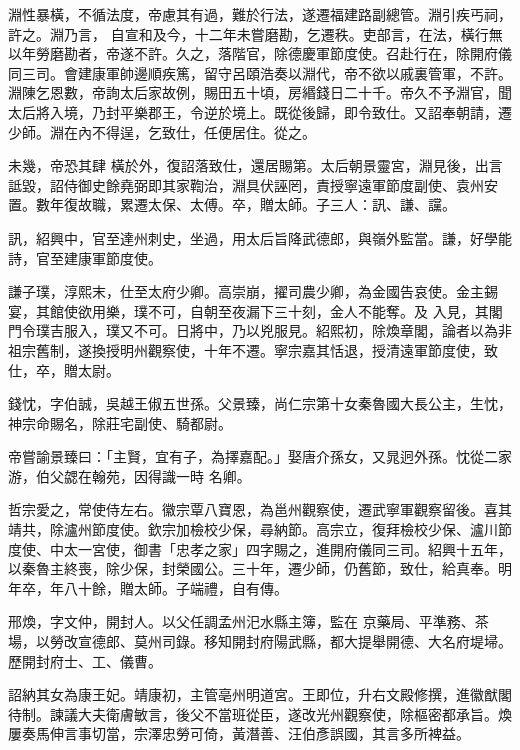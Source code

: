 \begin{pinyinscope}
 淵性暴橫，不循法度，帝慮其有過，難於行法，遂遷福建路副總管。淵引疾丐祠，許之。淵乃言，
 自宣和及今，十二年未嘗磨勘，乞遷秩。吏部言，在法，橫行無以年勞磨勘者，帝遂不許。久之，落階官，除德慶軍節度使。召赴行在，除開府儀同三司。會建康軍帥邊順疾篤，留守呂頤浩奏以淵代，帝不欲以戚裏管軍，不許。淵陳乞恩數，帝詢太后家故例，賜田五十頃，房緡錢日二十千。帝久不予淵官，聞太后將入境，乃封平樂郡王，令逆於境上。既從後歸，即令致仕。又詔奉朝請，遷少師。淵在內不得逞，乞致仕，任便居住。從之。



 未幾，帝恐其肆
 橫於外，復詔落致仕，還居賜第。太后朝景靈宮，淵見後，出言詆毀，詔侍御史餘堯弼即其家鞫治，淵具伏誣罔，責授寧遠軍節度副使、袁州安置。數年復故職，累遷太保、太傅。卒，贈太師。子三人：訊、謙、讜。



 訊，紹興中，官至達州刺史，坐過，用太后旨降武德郎，與嶺外監當。謙，好學能詩，官至建康軍節度使。



 謙子璞，淳熙末，仕至太府少卿。高崇崩，擢司農少卿，為金國告哀使。金主錫宴，其館使欲用樂，璞不可，自朝至夜漏下三十刻，金人不能奪。及
 入見，其閣門令璞吉服入，璞又不可。日將中，乃以兇服見。紹熙初，除煥章閣，論者以為非祖宗舊制，遂換授明州觀察使，十年不遷。寧宗嘉其恬退，授清遠軍節度使，致仕，卒，贈太尉。



 錢忱，字伯誠，吳越王俶五世孫。父景臻，尚仁宗第十女秦魯國大長公主，生忱，神宗命賜名，除莊宅副使、騎都尉。



 帝嘗諭景臻曰：「主賢，宜有子，為擇嘉配。」娶唐介孫女，又晁迥外孫。忱從二家游，伯父勰在翰苑，因得識一時
 名卿。



 哲宗愛之，常使侍左右。徽宗覃八寶恩，為邕州觀察使，遷武寧軍觀察留後。喜其靖共，除瀘州節度使。欽宗加檢校少保，尋納節。高宗立，復拜檢校少保、瀘川節度使、中太一宮使，御書「忠孝之家」四字賜之，進開府儀同三司。紹興十五年，以秦魯主終喪，除少保，封榮國公。三十年，遷少師，仍舊節，致仕，給真奉。明年卒，年八十餘，贈太師。子端禮，自有傳。



 邢煥，字文仲，開封人。以父任調孟州汜水縣主簿，監在
 京藥局、平準務、茶場，以勞改宣德郎、莫州司錄。移知開封府陽武縣，都大提舉開德、大名府堤埽。歷開封府士、工、儀曹。



 詔納其女為康王妃。靖康初，主管亳州明道宮。王即位，升右文殿修撰，進徽猷閣待制。諫議大夫衛膚敏言，後父不當班從臣，遂改光州觀察使，除樞密都承旨。煥屢奏馬伸言事切當，宗澤忠勞可倚，黃潛善、汪伯彥誤國，其言多所裨益。




\end{pinyinscope}
